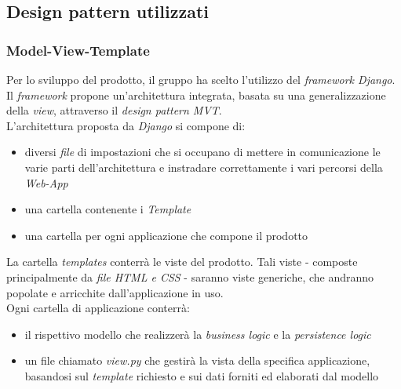 \documentclass[5pt]{article}
\begin{document}
	\subsection{Design pattern utilizzati}
			\subsubsection{Model-View-Template}
			Per lo sviluppo del prodotto, il gruppo ha scelto l'utilizzo del \textit{framework Django}. Il \textit{framework} propone un'architettura integrata,
			basata su una generalizzazione della \textit{view}, attraverso il \textit{design pattern MVT}. \\
			L'architettura proposta da \textit{Django} si compone di:
			\begin{itemize}
				\item diversi \textit{file} di impostazioni che si occupano di mettere in comunicazione le varie parti dell'architettura e instradare correttamente i vari percorsi della \textit{Web-App}
				\item una cartella contenente i \textit{Template}
				\item una cartella per ogni applicazione che compone il prodotto
			\end{itemize}
			La cartella \textit{templates} conterrà le viste del prodotto. Tali viste - composte principalmente da \textit{file HTML e CSS} - 
			saranno viste generiche, che andranno popolate e arricchite dall'applicazione in uso. \\
			Ogni cartella di applicazione conterrà:
			\begin{itemize}
				\item il rispettivo modello che realizzerà la \textit{business logic} e la \textit{persistence logic}
				\item un file chiamato \textit{view.py} che gestirà la vista della specifica applicazione, basandosi sul \textit{template} richiesto e sui dati forniti ed elaborati dal modello
			\end{itemize}
\end{document}
